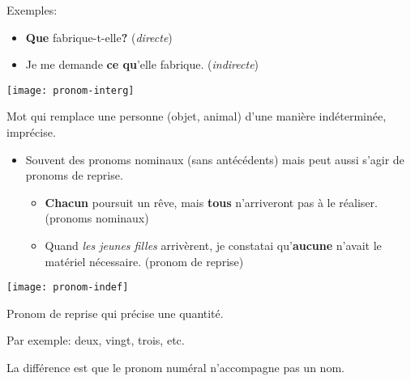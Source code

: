 \documentclass[10pt, french]{article}
\begin{document}
\begin{multicols*}{2}
\begin{definitionNOHFILLsub}
\tcbline

Exemples:
\begin{itemize}
	\item	\textbf{Que} fabrique-t-elle\textbf{?} (\textit{directe})
	\item	Je me demande \textbf{ce qu}'elle fabrique. (\textit{indirecte})
\end{itemize}
\begin{center}
	\texttt{[image: pronom-interg]}
\end{center}
\end{definitionNOHFILLsub}

\begin{definitionNOHFILLsub}
Mot qui remplace une personne (objet, animal) d'une manière indéterminée, imprécise.

\tcbline

\begin{itemize}
	\item	Souvent des pronoms nominaux (sans antécédents) mais peut aussi s'agir de pronoms de reprise.
		\begin{itemize}
		\item	\textbf{Chacun} poursuit un rêve, mais \textbf{tous} n'arriveront pas à le réaliser. (pronoms nominaux)
		\item	Quand \textit{les jeunes filles} arrivèrent, je constatai qu'\textbf{aucune} n'avait le matériel nécessaire. (pronom de reprise)
		\end{itemize}
\end{itemize}

\begin{center}
	\texttt{[image: pronom-indef]}
\end{center}
\end{definitionNOHFILLsub}

\begin{definitionNOHFILLsub}
Pronom de reprise qui précise une quantité.

\tcbline

Par exemple: deux, vingt, trois, etc.
\end{definitionNOHFILLsub}

\begin{astuces}
La différence est que le pronom numéral n'accompagne pas un nom.
\end{astuces}


\columnbreak

\end{multicols*}
\end{document}
